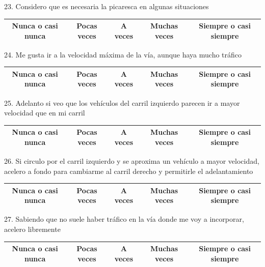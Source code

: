 23. Considero que es necesaria la picaresca en algunas situaciones
\vspace{-10pt}
\begin{table}[H]
\centering
\begin{tabular}{|c|c|c|c|c|}
\hline
Nunca o casi nunca & Pocas veces & A veces & Muchas veces & Siempre o casi siempre \\ \hline
\end{tabular}
\end{table}

24. Me gusta ir a la velocidad máxima de la vía, aunque haya mucho tráfico
\vspace{-10pt}
\begin{table}[h]
\centering
\begin{tabular}{|c|c|c|c|c|}
\hline
Nunca o casi nunca & Pocas veces & A veces & Muchas veces & Siempre o casi siempre \\ \hline
\end{tabular}
\end{table}

25. Adelanto si veo que los vehículos del carril izquierdo parecen ir a mayor velocidad que en mi carril
\vspace{-10pt}
\begin{table}[H]
\centering
\begin{tabular}{|c|c|c|c|c|}
\hline
Nunca o casi nunca & Pocas veces & A veces & Muchas veces & Siempre o casi siempre \\ \hline
\end{tabular}
\end{table}

26.  Si circulo por el carril izquierdo y se aproxima un vehículo a mayor velocidad, acelero a fondo para cambiarme al carril derecho y permitirle el adelantamiento
\vspace{-10pt}
\begin{table}[H]
\centering
\begin{tabular}{|c|c|c|c|c|}
\hline
Nunca o casi nunca & Pocas veces & A veces & Muchas veces & Siempre o casi siempre \\ \hline
\end{tabular}
\end{table}

27.  Sabiendo que no suele haber tráfico en la vía donde me voy a incorporar, acelero libremente 
\vspace{-10pt}
\begin{table}[H]
\centering
\begin{tabular}{|c|c|c|c|c|}
\hline
Nunca o casi nunca & Pocas veces & A veces & Muchas veces & Siempre o casi siempre \\ \hline
\end{tabular}
\end{table}
\newpage


